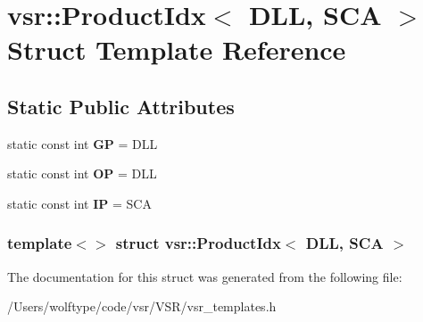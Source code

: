 \hypertarget{structvsr_1_1_product_idx_3_01_d_l_l_00_01_s_c_a_01_4}{\section{vsr\-:\-:Product\-Idx$<$ D\-L\-L, S\-C\-A $>$ Struct Template Reference}
\label{structvsr_1_1_product_idx_3_01_d_l_l_00_01_s_c_a_01_4}
}
\subsection*{Static Public Attributes}
\begin{DoxyCompactItemize}
\item 
\hypertarget{structvsr_1_1_product_idx_3_01_d_l_l_00_01_s_c_a_01_4_a877537288d3056fdb759d84f8d8ba262}{static const int {\bfseries G\-P} = D\-L\-L}\label{structvsr_1_1_product_idx_3_01_d_l_l_00_01_s_c_a_01_4_a877537288d3056fdb759d84f8d8ba262}

\item 
\hypertarget{structvsr_1_1_product_idx_3_01_d_l_l_00_01_s_c_a_01_4_af1efab6005b714d5dbc60ee8463f7923}{static const int {\bfseries O\-P} = D\-L\-L}\label{structvsr_1_1_product_idx_3_01_d_l_l_00_01_s_c_a_01_4_af1efab6005b714d5dbc60ee8463f7923}

\item 
\hypertarget{structvsr_1_1_product_idx_3_01_d_l_l_00_01_s_c_a_01_4_ac0795e622f62ecd163cb2429840e0e11}{static const int {\bfseries I\-P} = S\-C\-A}\label{structvsr_1_1_product_idx_3_01_d_l_l_00_01_s_c_a_01_4_ac0795e622f62ecd163cb2429840e0e11}

\end{DoxyCompactItemize}
\subsubsection*{template$<$$>$ struct vsr\-::\-Product\-Idx$<$ D\-L\-L, S\-C\-A $>$}



The documentation for this struct was generated from the following file\-:\begin{DoxyCompactItemize}
\item 
/\-Users/wolftype/code/vsr/\-V\-S\-R/vsr\-\_\-templates.\-h\end{DoxyCompactItemize}
